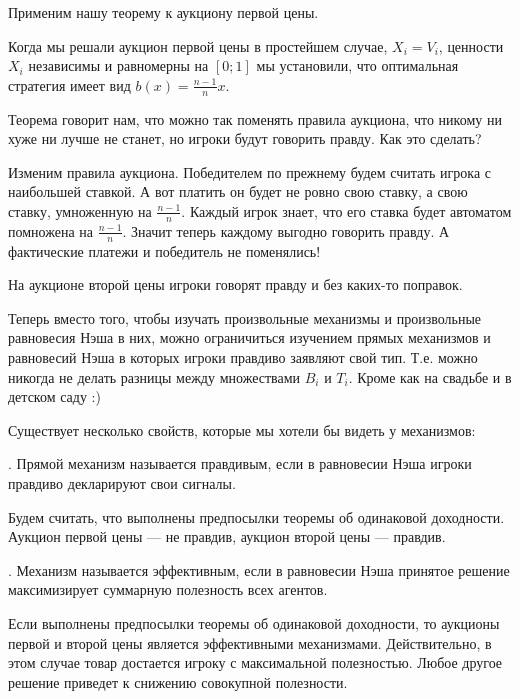 Применим нашу теорему к аукциону первой цены.

\begin{myex} Когда мы решали аукцион первой цены в простейшем случае, $ X_{i}=V_{i} $, ценности $ X_{i} $ независимы и равномерны на $ [0;1] $ мы установили, что оптимальная стратегия имеет вид $ b(x)=\frac{n-1}{n} x$. 

Теорема говорит нам, что можно так поменять правила аукциона, что никому ни хуже ни лучше не станет, но игроки будут говорить правду. Как это сделать?

Изменим правила аукциона. Победителем по прежнему будем считать игрока с наибольшей ставкой. А вот платить он будет не ровно свою ставку, а свою ставку, умноженную на $ \frac{n-1}{n} $. Каждый игрок знает, что его ставка будет автоматом помножена на $ \frac{n-1}{n} $. Значит теперь каждому выгодно говорить правду. А фактические платежи и победитель не поменялись!
\end{myex}

На аукционе второй цены игроки говорят правду и без каких-то поправок.

Теперь вместо того, чтобы изучать произвольные механизмы и произвольные равновесия Нэша в них, можно ограничиться изучением прямых механизмов и равновесий Нэша в которых игроки правдиво заявляют свой тип. Т.е. можно никогда не делать разницы между множествами $ B_{i} $ и $ T_{i} $. Кроме как на свадьбе и в детском саду :)

Существует несколько свойств, которые мы хотели бы видеть у механизмов:

\begin{mydef}
. Прямой механизм называется правдивым, если в равновесии Нэша игроки правдиво декларируют свои сигналы.
\end{mydef}

\begin{myex}
Будем считать, что выполнены предпосылки теоремы об одинаковой доходности. Аукцион первой цены --- не правдив, аукцион второй цены --- правдив.
\end{myex}

\begin{mydef} . Механизм называется эффективным, если в равновесии Нэша принятое решение максимизирует суммарную полезность всех агентов.
\end{mydef}

\begin{myex} Если выполнены предпосылки теоремы об одинаковой доходности, то аукционы первой и второй цены является эффективными механизмами. Действительно, в этом случае товар достается игроку с максимальной полезностью. Любое другое решение приведет к снижению совокупной полезности. 
\end{myex}

